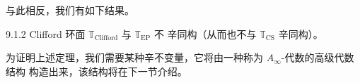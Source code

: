 
与此相反，我们有如下结果。

\begin{wthm}{9.1.2}
  Clifford 环面 $\mathbb{T}_{\mathrm{Clifford}}$ 与 $\mathbb{T}_{\mathrm{EP}}$ 不
  辛同构（从而也不与 $\mathbb{T}_{\mathrm{CS}}$ 辛同构）。
\end{wthm}

为证明上述定理，我们需要某种辛不变量，它将由一种称为 $A_\infty$-代数的高级代数结构
构造出来，该结构将在下一节介绍。
